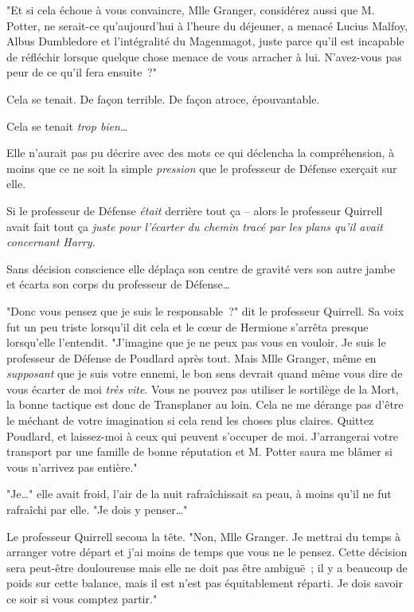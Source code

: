 "Et si cela échoue à vous convaincre, Mlle Granger, considérez aussi que M. Potter, ne serait-ce qu'aujourd'hui à l'heure du déjeuner, a menacé Lucius Malfoy, Albus Dumbledore et l'intégralité du Magenmagot, juste parce qu'il est incapable de réfléchir lorsque quelque chose menace de vous arracher à lui. N'avez-vous pas peur de ce qu'il fera ensuite~?"

Cela se tenait. De façon terrible. De façon atroce, épouvantable.

Cela se tenait \emph{trop bien}…

Elle n'aurait pas pu décrire avec des mots ce qui déclencha la compréhension, à moins que ce ne soit la simple \emph{pression} que le professeur de Défense exerçait sur elle.

Si le professeur de Défense \emph{était} derrière tout ça -- alors le professeur Quirrell avait fait tout ça \emph{juste pour l'écarter du chemin tracé par les plans qu'il avait concernant Harry.}

Sans décision conscience elle déplaça son centre de gravité vers son autre jambe et écarta son corps du professeur de Défense…

"Donc vous pensez que je suis le responsable~?" dit le professeur Quirrell. Sa voix fut un peu triste lorsqu'il dit cela et le cœur de Hermione s'arrêta presque lorsqu'elle l'entendit. "J'imagine que je ne peux pas vous en vouloir. Je suis le professeur de Défense de Poudlard après tout. Mais Mlle Granger, même en \emph{supposant} que je suis votre ennemi, le bon sens devrait quand même vous dire de vous écarter de moi \emph{très vite}. Vous ne pouvez pas utiliser le sortilège de la Mort, la bonne tactique est donc de Transplaner au loin. Cela ne me dérange pas d'être le méchant de votre imagination si cela rend les choses plus claires. Quittez Poudlard, et laissez-moi à ceux qui peuvent s'occuper de moi. J'arrangerai votre transport par une famille de bonne réputation et M. Potter saura me blâmer si vous n'arrivez pas entière."

"Je…" elle avait froid, l'air de la nuit rafraîchissait sa peau, à moins qu'il ne fut rafraîchi par elle. "Je dois y penser…"

Le professeur Quirrell secoua la tête. "Non, Mlle Granger. Je mettrai du temps à arranger votre départ et j'ai moins de temps que vous ne le pensez. Cette décision sera peut-être douloureuse mais elle ne doit pas être ambiguë~; il y a beaucoup de poids sur cette balance, mais il est n'est pas équitablement réparti. Je dois savoir ce soir si vous comptez partir."

